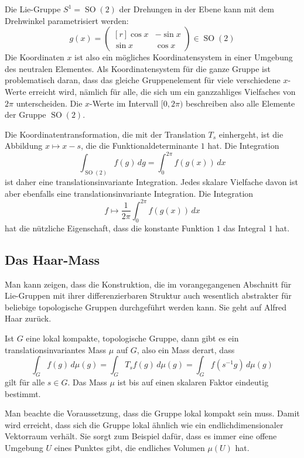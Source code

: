\begin{beispiel}
Die Lie-Gruppe $S^1 = \operatorname{SO}(2)$ der Drehungen in der Ebene
kann mit dem Drehwinkel parametrisiert werden:
\[
g(x)
=
\begin{pmatrix*}[r]
\cos x&-\sin x\\
\sin x& \cos x
\end{pmatrix*}
\in
\operatorname{SO}(2)
\]
Die Koordinaten $x$ ist also ein mögliches Koordinatensystem in einer
Umgebung des neutralen Elementes.
Als Koordinatensystem für die ganze Gruppe ist problematisch daran,
dass das gleiche Gruppenelement für viele verschiedene $x$-Werte
erreicht wird, nämlich für alle, die sich um ein ganzzahliges
Vielfaches von $2\pi$ unterscheiden.
Die $x$-Werte im Intervall $[0,2\pi)$ beschreiben also alle Elemente
der Gruppe $\operatorname{SO}(2)$. 

Die Koordinatentransformation, die mit der Translation $T_s$ einhergeht,
ist die Abbildung $x\mapsto x-s$, die die Funktionaldeterminante $1$
hat.
Die Integration
\[
\int_{\operatorname{SO}(2)} f(g) \,dg
=
\int_0^{2\pi} f(g(x))\,dx
\]
ist daher eine translationsinvariante Integration.
Jedes skalare Vielfache davon ist aber ebenfalls eine translationsinvariante
Integration.
Die Integration
\[
f
\mapsto
\frac{1}{2\pi}\int_0^{2\pi} f(g(x))\,dx
\]
hat die nützliche Eigenschaft, dass die konstante Funktion $1$ das
Integral $1$ hat.
\end{beispiel}

%
%
\subsection{Das Haar-Mass
\label{buch:haar:subsection:haar}}
Man kann zeigen, dass die Konstruktion, die im vorangegangenen Abschnitt
für Lie-Gruppen mit ihrer differenzierbaren Struktur auch wesentlich
abstrakter für beliebige topologische Gruppen durchgeführt werden kann.
Sie geht auf Alfred Haar zurück.

\begin{satz}[Haar]
\label{buch:gruppen:haar:satz:haar}
Ist $G$ eine lokal kompakte, topologische Gruppe, dann gibt es ein
translationsinvariantes Mass $\mu$ auf $G$, also ein Mass derart,
dass 
\[
\int_G f(g)\,d\mu(g)
=
\int_G T_sf(g)\,d\mu(g)
=
\int_G f(s^{-1}g)\,d\mu(g)
\]
gilt für alle $s\in G$.
Das Mass $\mu$ ist bis auf einen skalaren Faktor eindeutig bestimmt.
\end{satz}

Man beachte die Voraussetzung, dass die Gruppe lokal kompakt sein
muss.
Damit wird erreicht, dass sich die Gruppe lokal ähnlich wie ein
endlichdimensionaler Vektorraum verhält.
Sie sorgt zum Beispiel dafür, dass es immer eine offene Umgebung
$U$ eines Punktes gibt, die endliches Volumen $\mu(U)$ hat.

